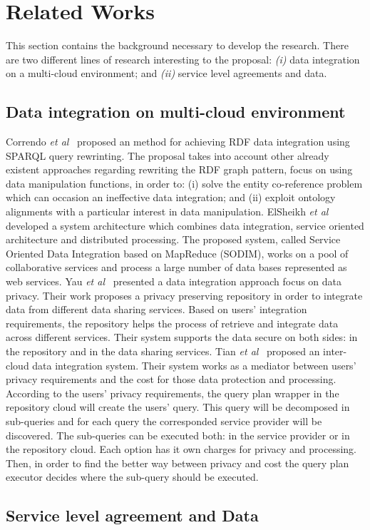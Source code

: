 \section{Related Works}\label{sec:rw}
This section contains the background necessary to develop the research.
There are two different lines of research interesting to the proposal:
\textit{(i)} data integration on a multi-cloud environment; and
\textit{(ii)} service level agreements and data.

\subsection{Data integration on multi-cloud environment}
Correndo \textit{et al}~\cite{075} proposed an method for achieving RDF data integration
using SPARQL query rewrinting. 
The proposal takes into account other already existent approaches regarding rewriting 
the RDF graph pattern, focus on using data manipulation functions, in order to: (i) solve 
the entity co-reference problem which can occasion an ineffective data integration; 
and (ii) exploit ontology alignments with a particular interest in data manipulation. 
ElSheikh \textit{et al}~\cite{078} developed a system architecture which combines data integration,
service oriented architecture and distributed processing. The proposed system, called Service 
Oriented Data Integration based on MapReduce (SODIM), works on a pool of collaborative services and 
process a large number of data bases represented as web services. 
Yau \textit{et al}~\cite{YauY08} presented a data integration approach focus on data privacy.
Their work proposes a privacy preserving repository in order to integrate data from
different data sharing services. 
Based on users' integration requirements, the repository helps the process of retrieve and integrate
data across different services.
Their system supports the data secure on both sides: in the repository and in the data sharing services. 
Tian \textit{et al}~\cite{096} proposed an inter-cloud data integration system. 
Their system works as a mediator between users' privacy requirements and the cost for those data 
protection and processing.
According to the users' privacy requirements, the query plan wrapper in the repository cloud will
create the users' query. This query will be decomposed in sub-queries and for each query the 
corresponded service provider will be discovered. 
The sub-queries can be executed both: in the service provider or in the repository cloud.
Each option has it own charges for privacy and processing. 
Then, in order to find the better way between privacy and cost the query plan executor decides where 
the sub-query should be executed.

\subsection{Service level agreement and Data}




